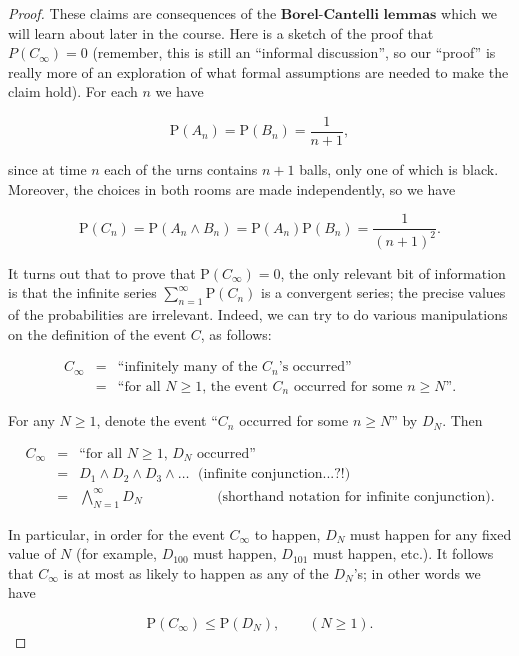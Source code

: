 \documentclass[11pt]{report}
\theoremstyle{plain}
\theoremstyle{definition}
\begin{document}
\begin{proof}
These claims are consequences of the
$\textbf{Borel-Cantelli lemmas}$ which we will learn
about later in the course. Here is a sketch of the
proof that $P(C_\infty)=0$ (remember, this is still
an ``informal discussion'', so our ``proof'' is really
more of an exploration of what formal assumptions are
needed to make the claim hold). For each $n$ we have

\[
\mathrm{P}(A_n) = \mathrm{P}(B_n) = \frac{1}{n+1},
\]

since at time $n$ each of the urns contains $n+1$
balls, only one of which is black. Moreover, the
choices in both rooms are made independently, so we
have

\[
\mathrm{P}(C_n) = \mathrm{P}(A_n \wedge B_n) = \mathrm{P}(A_n) \mathrm{P}(B_n) = \frac{1}{(n+1)^2}.
\]

It turns out that to prove that
$\mathrm{P}(C_\infty)=0$, the only relevant bit of
information is that the infinite series
$\sum_{n=1}^\infty \mathrm{P}(C_n)$ is a convergent
series; the precise values of the probabilities are
irrelevant. Indeed, we can try to do various
manipulations on the definition of the event $C$, as
follows:

\begin{eqnarray*}
C_\infty &=& \textrm{``infinitely many of the $C_n$'s occurred''} \\
&=& \textrm{``for all $N\ge 1$, the event $C_n$ occurred for some $n\ge N$''.}
\end{eqnarray*}

For any $N\ge 1$, denote the event ``$C_n$ occurred
for some $n\ge N$'' by $D_N$. Then

\begin{eqnarray*}
C_\infty &=& \textrm{``for all $N\ge 1$, $D_N$ occurred''} \\
&=& D_1 \wedge D_2 \wedge D_3 \wedge \ldots \ \ \, \textrm{(infinite conjunction...?!)} \\
&=& \bigwedge_{N=1}^\infty D_N \quad \qquad \quad\ \ \ \ \ \ \textrm{(shorthand notation for infinite conjunction)}.
\end{eqnarray*}

In particular, in order for the event $C_\infty$ to
happen, $D_N$ must happen for any fixed value of $N$
(for example, $D_{100}$ must happen, $D_{101}$ must
happen, etc.). It follows that $C_\infty$ is at most
as likely to happen as any of the $D_N$'s; in other
words we have

\[
\mathrm{P}(C_\infty) \le \mathrm{P}(D_N), \qquad (N\ge 1).
\]


\end{proof}
\end{document}

